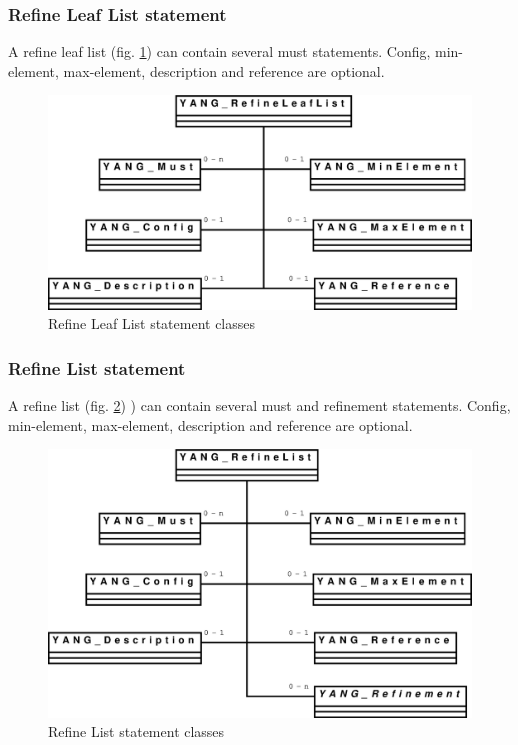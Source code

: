 \documentclass[a4paper]{article}
\begin{document}
\subsubsection{Refine Leaf List statement}

A refine leaf list  (fig. \ref{refineleaflist}) can contain several
must  statements. Config,  min-element,  max-element, description  and
reference are optional.
\begin{figure}[htbp]
\begin{center}
\includegraphics[scale = .3]{refineleaflist.eps}
\end{center}
\caption{Refine Leaf List statement classes}
\label{refineleaflist}
\end{figure}

\subsubsection{Refine List statement}

A refine list  (fig. \ref{refinelist}) ) can contain  several must and
refinement statements.   Config, min-element, max-element, description
and reference are optional.
\begin{figure}[htbp]
\begin{center}
\includegraphics[scale = .3]{refinelist.eps}
\end{center}
\caption{Refine List statement classes}
\label{refinelist}
\end{figure}
\end{document}
